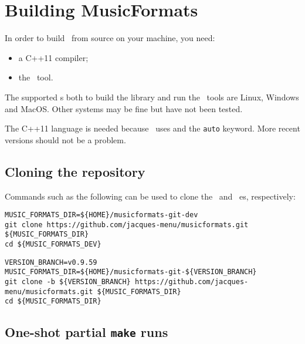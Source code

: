 
\chapter{Building MusicFormats}

In order to build \mf\ from source on your machine, you need:
\begin{itemize}
\item a C++11 compiler;
\item the \cmake\ tool.
\end{itemize}

The supported \OS s both to build the library and run the \CLI\ tools are Linux, Windows and MacOS. Other systems may be fine but have not been tested.

The C++11 language is needed because \mf\ uses  and the {\tt auto} keyword. More recent versions should not be a problem.


\section{Cloning the repository}

Commands such as the following can be used to clone the \master\ and \version\ \branch es, respectively:

\begin{lstlisting}[language=Terminal]
MUSIC_FORMATS_DIR=${HOME}/musicformats-git-dev
git clone https://github.com/jacques-menu/musicformats.git ${MUSIC_FORMATS_DIR}
cd ${MUSIC_FORMATS_DEV}
\end{lstlisting}

\begin{lstlisting}[language=Terminal]
VERSION_BRANCH=v0.9.59
MUSIC_FORMATS_DIR=${HOME}/musicformats-git-${VERSION_BRANCH}
git clone -b ${VERSION_BRANCH} https://github.com/jacques-menu/musicformats.git ${MUSIC_FORMATS_DIR}
cd ${MUSIC_FORMATS_DIR}
\end{lstlisting}


\section{One-shot partial {\tt make} runs}

